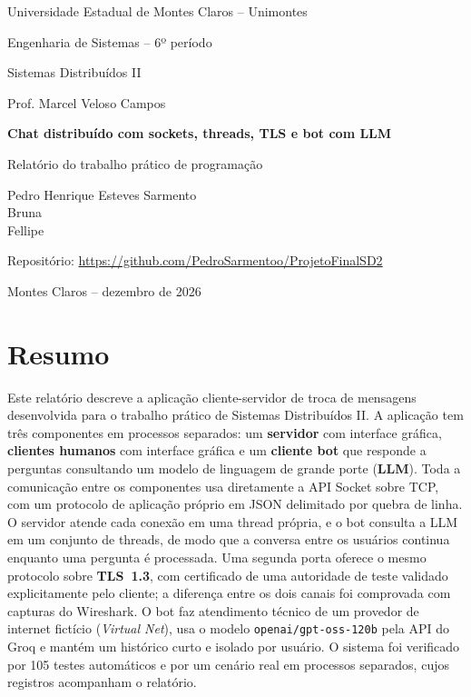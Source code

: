 \documentclass[11pt,a4paper]{article}
\newcommand{\disciplina}{Sistemas Distribuídos II}
\newcommand{\professor}{Prof. Marcel Veloso Campos}
\newcommand{\titulo}{Chat distribuído com sockets, threads, TLS e bot com LLM}
\newcommand{\integrantes}{Pedro Henrique Esteves Sarmento \\ Bruna \\ Fellipe}
\newcommand{\repositorio}{\url{https://github.com/PedroSarmentoo/ProjetoFinalSD2}}
\newcommand{\cod}[1]{\texttt{#1}}
\begin{document}
\begin{titlepage}
\centering
{\large Universidade Estadual de Montes Claros -- Unimontes\par}
{\large Engenharia de Sistemas -- 6º período\par}
\vspace{0.6cm}
{\large \disciplina\par}
{\normalsize \professor\par}
\vfill
{\LARGE\bfseries \titulo\par}
\vspace{0.6cm}
{\large Relatório do trabalho prático de programação\par}
\vfill
{\large \integrantes\par}
\vfill
{\small Repositório: \repositorio\par}
\vspace{0.8cm}
{\large Montes Claros -- dezembro de 2026\par}
\end{titlepage}

\section*{Resumo}
Este relatório descreve a aplicação cliente-servidor de troca de mensagens desenvolvida para
o trabalho prático de \disciplina. A aplicação tem três componentes em processos separados:
um \textbf{servidor} com interface gráfica, \textbf{clientes humanos} com interface gráfica e um
\textbf{cliente bot} que responde a perguntas consultando um modelo de linguagem de grande porte
(\textbf{LLM}). Toda a comunicação entre os componentes usa diretamente a API Socket sobre TCP, com
um protocolo de aplicação próprio em JSON delimitado por quebra de linha. O servidor atende cada
conexão em uma thread própria, e o bot consulta a LLM em um conjunto de threads, de modo que a
conversa entre os usuários continua enquanto uma pergunta é processada. Uma segunda porta oferece
o mesmo protocolo sobre \textbf{TLS~1.3}, com certificado de uma autoridade de teste validado
explicitamente pelo cliente; a diferença entre os dois canais foi comprovada com capturas do
Wireshark. O bot faz atendimento técnico de um provedor de internet fictício (\emph{Virtual Net}),
usa o modelo \cod{openai/gpt-oss-120b} pela API do Groq e mantém um histórico curto e isolado por
usuário. O sistema foi verificado por 105 testes automáticos e por um cenário real em processos
separados, cujos registros acompanham o relatório.
\end{document}
